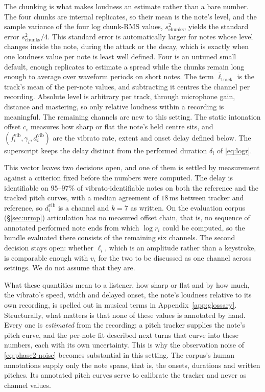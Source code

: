 The chunking is what makes loudness an estimate rather than a bare
number. The four chunks are internal replicates, so their mean is the
note's level, and the sample variance of the four log chunk-RMS values,
$s^2_{\mathrm{chunks}}$, yields the standard error
$s^2_{\mathrm{chunks}}/4$. This standard error is automatically larger for
notes whose level changes inside the note, during the attack or the decay,
which is exactly when one loudness value per note is least well defined.
Four is an untuned small default, enough replicates to estimate a spread
while the chunks remain long enough to average over waveform periods on
short notes. The term $\overline{\ell}_{\mathrm{track}}$ is the track's
mean of the per-note values, and subtracting it centres the channel per
recording. Absolute level is arbitrary per track, through microphone gain,
distance and mastering, so only relative loudness within a recording is
meaningful. The remaining channels are new to this setting. The static
intonation offset $c_i$ measures how sharp or flat the note's held centre
sits, and $(f_i^{\mathrm{vib}}, \gamma_i, d_i^{\mathrm{vib}})$ are the
vibrato rate, extent and onset delay defined below. The superscript keeps
the delay distinct from the performed duration $\delta_i$ of
\eqref{eq:logr}.

This vector leaves two decisions open, and one of them is settled by
measurement against a criterion fixed before the numbers were computed.
The delay is identifiable on $95$--$97\%$ of vibrato-identifiable notes
on both the reference and the tracked pitch curves, with a median
agreement of $18$\,ms between tracker and reference, so
$d_i^{\mathrm{vib}}$ is a channel and $k = 7$ as written. On the
evaluation corpus (\S\ref{sec:urmp}) articulation has no measured offset
chain, that is, no sequence of annotated performed note ends from which
$\log r_i$ could be computed, so the bundle evaluated there consists of
the remaining six channels. The second decision stays open: whether
$\ell_i$, which is an amplitude rather than a keystroke, is comparable
enough with $v_i$ for the two to be discussed as one channel across
settings. We do not assume that they are.

What these quantities mean to a listener, how sharp or flat and by how
much, the vibrato's speed, width and delayed onset, the note's loudness
relative to its own recording, is spelled out in musical terms in
Appendix~\ref{app:glossary}. Structurally, what matters is that none of
these values is annotated by hand. Every one is \emph{estimated} from the
recording: a pitch tracker supplies the note's pitch curve, and the
per-note fit described next turns that curve into these numbers, each
with its own uncertainty. This is why the observation noise of
\eqref{eq:phase2-noise} becomes substantial in this setting. The corpus's
human annotations supply only the note spans, that is, the onsets,
durations and written pitches. Its annotated pitch curves serve to
calibrate the tracker and never as channel values.

